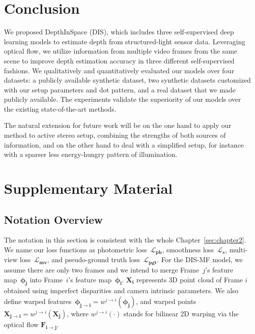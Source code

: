 \section{Conclusion}

We proposed DepthInSpace (DIS), which includes three self-supervised deep learning models to estimate depth from structured-light sensor data. Leveraging optical flow, we utilize information from multiple video frames from the same scene to improve depth estimation accuracy in three different self-supervised fashions. We qualitatively and quantitatively evaluated our models over four datasets: a publicly available synthetic dataset, two synthetic datasets customized with our setup parameters and dot pattern, and a real dataset that we made publicly available. The experiments validate the superiority of our models over the existing state-of-the-art methods.

The natural extension for future work will be on the one hand to apply our method to active stereo setup, combining the strengths of both sources of information, and on the other hand to deal with a simplified setup, for instance with a sparser less energy-hungry pattern of illumination.

\section{Supplementary Material}

\subsection{Notation Overview}

The notation in this section is consistent with the whole Chapter~\ref{sec:chapter2}. We name our loss functions as photometric loss~$\boldsymbol{\mathcal{L}_{ph}}$, smoothness loss~$\boldsymbol{\mathcal{L}_s}$, multi-view loss~$\boldsymbol{\mathcal{L}_{mv}}$, and pseudo-ground truth loss~$\boldsymbol{\mathcal{L}_{pgt}}$. For the DIS-MF model, we assume there are only two frames and we intend to merge Frame~$j$'s feature map~$\boldsymbol{\phi_j}$ into Frame~$i$'s feature map~$\boldsymbol{\phi_i}$. $\boldsymbol{X_i}$ represents 3D point cloud of Frame $i$ obtained using imperfect disparities and camera intrinsic parameters. We also define warped features~$\boldsymbol{\phi_{j \rightarrow i}}=w^{j \rightarrow i}(\boldsymbol{\phi_j})$, and warped points~$\boldsymbol{X_{j \rightarrow i}}=w^{j \rightarrow i}(\boldsymbol{X_j})$, where $w^{j \rightarrow i}(\cdot)$ stands for bilinear 2D warping via the optical flow $\boldsymbol{F_{i \rightarrow j}}$.

